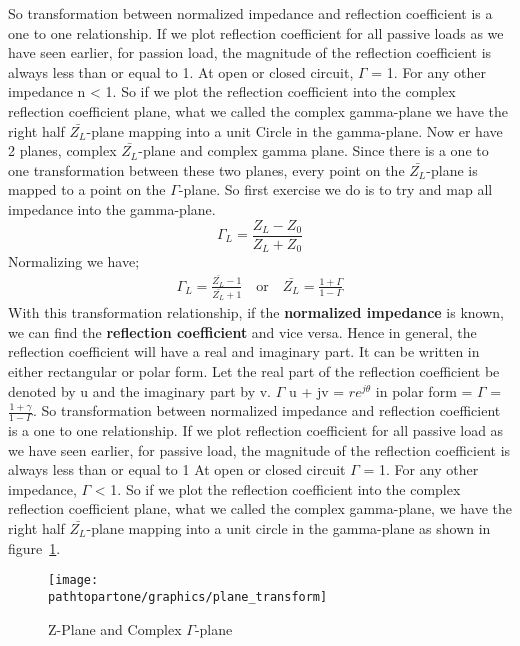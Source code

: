 So transformation between normalized impedance and reflection coefficient is a one to one relationship. If we plot reflection coefficient for all passive loads as we have seen earlier, for passion load, the magnitude of the reflection coefficient is always less than or equal to 1. At open or closed circuit, $\Gamma$ = 1. For any other impedance n < 1. So if we plot the reflection coefficient into the complex reflection coefficient plane, what we called the complex gamma-plane we have the right half $\bar{Z_L}$-plane mapping into a unit Circle in the gamma-plane. Now er have 2 planes, complex $\bar{Z_L}$-plane and complex gamma plane. Since there is a one to one transformation between these two planes, every point on the $\bar{Z_L}$-plane is mapped to a point on the $\Gamma$-plane. So first exercise we do is to try and map all impedance into the gamma-plane.
\begin{equation}
\Gamma_L = \frac{Z_L - Z_0}{Z_L + Z_0}\label{eqn:refcoefficientfromload07}
\end{equation}
Normalizing we have;
\begin{align*}
\Gamma_L = \frac{\bar{Z_L} - 1}{\bar{Z_L} + 1}\quad\text{or}\quad\bar{Z_L}= \frac{1 + \Gamma}{1 - \Gamma}
\end{align*}
With this transformation relationship, if the \textbf{normalized impedance} is known, we can find the \textbf{reflection coefficient} and vice versa. Hence in general, the reflection coefficient will have a real and imaginary part. It can be written in either rectangular or polar form. Let the real part of the reflection coefficient be denoted by u and the imaginary part by v. $\Gamma$ u + jv = $re^{j\theta}$ in polar form = $\Gamma$ = $\frac{1 + \gamma}{1-\Gamma}$. So transformation between normalized impedance and reflection coefficient is a one to one relationship. If we plot reflection coefficient for all passive load as we have seen earlier, for passive load, the magnitude of the reflection coefficient is always less than or equal to 1 At open or closed circuit $\Gamma$ = 1. For any other impedance, $\Gamma$ < 1. So if we plot the reflection coefficient into the complex reflection coefficient plane, what we called the complex gamma-plane, we have the right half $\bar{Z_L}$-plane mapping into a unit circle in the gamma-plane  as shown in figure~\ref{fig:oiuhgvcx}.
\begin{figure}[h]
\centering
\texttt{[image: \\pathtopartone/graphics/plane\_transform]}
\caption{Z-Plane and Complex $\Gamma$-plane}
\label{fig:oiuhgvcx}
\end{figure}

